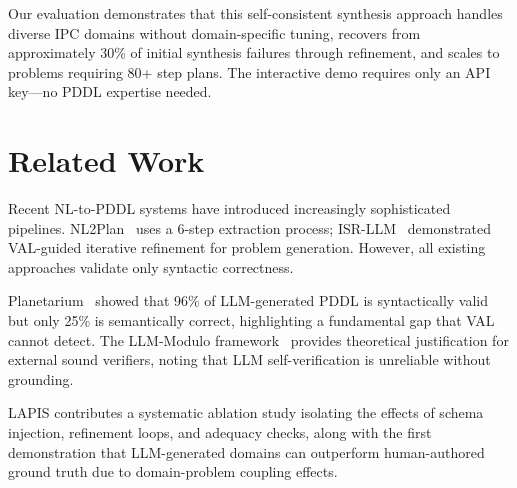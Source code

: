 \documentclass[letterpaper]{article}
\begin{document}
Our evaluation demonstrates that this self-consistent synthesis approach handles diverse IPC domains without domain-specific tuning, recovers from approximately 30\% of initial synthesis failures through refinement, and scales to problems requiring 80+ step plans. The interactive demo requires only an API key---no PDDL expertise needed.

\section{Related Work}

Recent NL-to-PDDL systems have introduced increasingly sophisticated pipelines. NL2Plan~\citep{nl2plan2025} uses a 6-step extraction process; ISR-LLM~\citep{isrllm2024} demonstrated VAL-guided iterative refinement for problem generation.
However, all existing approaches validate only syntactic correctness.

Planetarium~\citep{planetarium2025} showed that 96\% of LLM-generated PDDL is syntactically valid but only 25\% is semantically correct, highlighting a fundamental gap that VAL cannot detect. The LLM-Modulo framework~\citep{llmmodulo2024} provides theoretical justification for external sound verifiers, noting that LLM self-verification is unreliable without grounding.

LAPIS contributes a systematic ablation study isolating the effects of schema injection, refinement loops, and adequacy checks, along with the first demonstration that LLM-generated domains can outperform human-authored ground truth due to domain-problem coupling effects.

\end{document}
